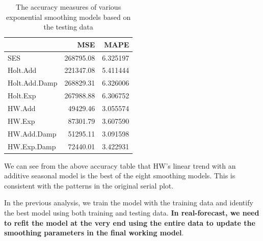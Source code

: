 \documentclass[
]{book}
\newenvironment{Shaded}{\begin{snugshade}}{\end{snugshade}}
\newcommand{\AttributeTok}[1]{\textcolor[rgb]{0.13,0.29,0.53}{#1}}
\newcommand{\DecValTok}[1]{\textcolor[rgb]{0.00,0.00,0.81}{#1}}
\newcommand{\FunctionTok}[1]{\textcolor[rgb]{0.13,0.29,0.53}{\textbf{#1}}}
\newcommand{\NormalTok}[1]{#1}
\newcommand{\OtherTok}[1]{\textcolor[rgb]{0.56,0.35,0.01}{#1}}
\newcommand{\SpecialCharTok}[1]{\textcolor[rgb]{0.81,0.36,0.00}{\textbf{#1}}}
\newcommand{\StringTok}[1]{\textcolor[rgb]{0.31,0.60,0.02}{#1}}
\begin{document}
\begin{table}

\caption{\label{tab:unnamed-chunk-252}The accuracy measures of various exponential smoothing models 
      based on the testing data}
\centering
\begin{tabular}[t]{l|r|r}
\hline
  & MSE & MAPE\\
\hline
SES & 268795.08 & 6.325197\\
\hline
Holt.Add & 221347.08 & 5.411444\\
\hline
Holt.Add.Damp & 268829.31 & 6.326006\\
\hline
Holt.Exp & 267988.88 & 6.306752\\
\hline
HW.Add & 49429.46 & 3.055574\\
\hline
HW.Exp & 87301.79 & 3.607590\\
\hline
HW.Add.Damp & 51295.11 & 3.091598\\
\hline
HW.Exp.Damp & 72440.01 & 3.422931\\
\hline
\end{tabular}
\end{table}

We can see from the above accuracy table that HW's linear trend with an additive seasonal model is the best of the eight smoothing models. This is consistent with the patterns in the original serial plot.

In the previous analysis, we train the model with the training data and identify the best model using both training and testing data. \textbf{In real-forecast, we need to refit the model at the very end using the entire data to update the smoothing parameters in the final working model}.

\begin{Shaded}
\end{Shaded}
\end{document}
